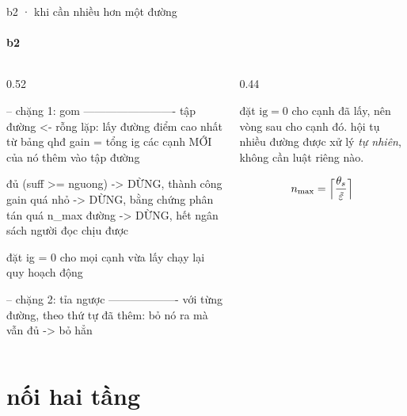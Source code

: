 \begin{frame}[fragile]{b2 · khi cần nhiều hơn một đường}
  \framesubtitle{b2}

  \begin{columns}[t]
  \begin{column}{0.52\textwidth}
    \begin{bx}[title={hai chặng}]
      \begin{dia}
-- chặng 1: gom -------------------------
tập đường <- rỗng
lặp:
    lấy đường điểm cao nhất từ bảng qhđ
    gain = tổng ig các cạnh MỚI của nó
    thêm vào tập đường

    đủ (suff >= nguong)  -> DỪNG, thành công
    gain quá nhỏ         -> DỪNG, bằng chứng
                            phân tán
    quá n_max đường      -> DỪNG, hết ngân sách
                            người đọc chịu được

    đặt ig = 0 cho mọi cạnh vừa lấy
    chạy lại quy hoạch động

-- chặng 2: tỉa ngược -------------------
với từng đường, theo thứ tự đã thêm:
    bỏ nó ra mà vẫn đủ  ->  bỏ hẳn
      \end{dia}
    \end{bx}
  \end{column}
  \begin{column}{0.44\textwidth}
    \begin{keyb}[title={cạnh dùng chung tự thành miễn phí}]
      đặt $\mathrm{ig} = 0$ cho cạnh đã lấy, nên vòng sau 
      cho cạnh đó. hội tụ nhiều đường được xử lý \emph{tự nhiên}, không cần luật
      riêng nào.
    \end{keyb}
    \begin{bx}[title={$n_{\max}$ không phải con số chọn bừa}]
      \[ n_{\max} = \Bigl\lceil \frac{\theta_s}{\tilde\varepsilon} \Bigr\rceil \]
    \end{bx}
  \end{column}
  \end{columns}
\end{frame}

\section{nối hai tầng}

